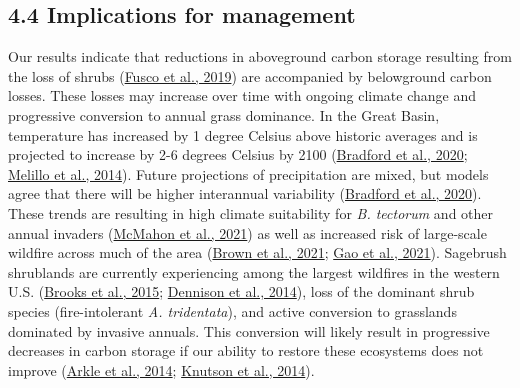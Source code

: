 \documentclass[
  11pt,
  a4paper,
]{article}
\begin{document}
\hypertarget{implications-for-management}{%
\subsection{4.4 Implications for management}\label{implications-for-management}}

Our results indicate that reductions in aboveground carbon storage resulting from the loss of shrubs (\protect\hyperlink{ref-Fusco2019}{Fusco et al., 2019}) are accompanied by belowground carbon losses. These losses may increase over time with ongoing climate change and progressive conversion to annual grass dominance. In the Great Basin, temperature has increased by 1 degree Celsius above historic averages and is projected to increase by 2-6 degrees Celsius by 2100 (\protect\hyperlink{ref-Bradford2020}{Bradford et al., 2020}; \protect\hyperlink{ref-melillo2014}{Melillo et al., 2014}). Future projections of precipitation are mixed, but models agree that there will be higher interannual variability (\protect\hyperlink{ref-Bradford2020}{Bradford et al., 2020}). These trends are resulting in high climate suitability for \emph{B. tectorum} and other annual invaders (\protect\hyperlink{ref-Mcmahon2021}{McMahon et al., 2021}) as well as increased risk of large-scale wildfire across much of the area (\protect\hyperlink{ref-Brown2021}{Brown et al., 2021}; \protect\hyperlink{ref-Gao2021}{Gao et al., 2021}). Sagebrush shrublands are currently experiencing among the largest wildfires in the western U.S. (\protect\hyperlink{ref-Brooks2015}{Brooks et al., 2015}; \protect\hyperlink{ref-Dennison2014}{Dennison et al., 2014}), loss of the dominant shrub species (fire-intolerant \emph{A. tridentata}), and active conversion to grasslands dominated by invasive annuals. This conversion will likely result in progressive decreases in carbon storage if our ability to restore these ecosystems does not improve (\protect\hyperlink{ref-Arkle2014}{Arkle et al., 2014}; \protect\hyperlink{ref-Knutson2014}{Knutson et al., 2014}).
\end{document}
